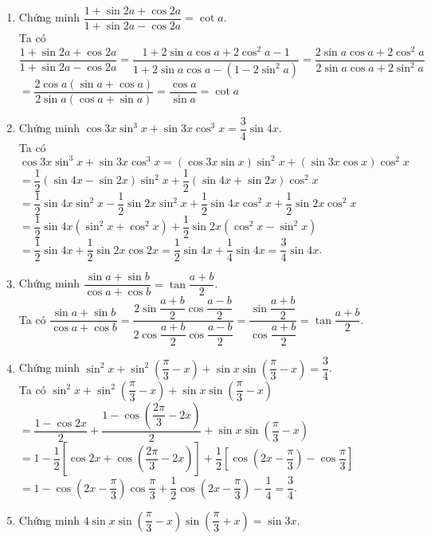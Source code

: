 \begin{bt}
{\begin{enumerate}
			\item Chứng minh $\dfrac{1+\sin 2a+\cos 2a}{1+\sin 2a-\cos 2a}=\cot a$. \\
			Ta có $\dfrac{1+\sin 2a+\cos 2a}{1+\sin 2a-\cos 2a}=\dfrac{1+2\sin a\cos a+2\cos^2a-1}{1+2\sin a\cos a-\left(1-2\sin^2a\right)}=\dfrac{2\sin a\cos a+2\cos^2a}{2\sin a\cos a+2\sin^2a}$ \\
			$=\dfrac{2\cos a\left(\sin a+\cos a\right)}{2\sin a\left(\cos a+\sin a\right)}=\dfrac{\cos a}{\sin a}=\cot a$
			\item Chứng minh $\cos 3x\sin^3x+\sin 3x\cos^3x=\dfrac{3}{4}\sin 4x$.\\
			Ta có $\cos 3x\sin^3x+\sin 3x\cos^3x=\left(\cos 3x\sin x\right)\sin^2x+\left(\sin 3x\cos x\right)\cos^2x$ \\
			$=\dfrac{1}{2}\left(\sin 4x-\sin 2x\right)\sin^2x+\dfrac{1}{2}\left(\sin 4x+\sin 2x\right)\cos^2x$ \\
			$=\dfrac{1}{2}\sin 4x\sin^2x-\dfrac{1}{2}\sin 2x\sin^2x+\dfrac{1}{2}\sin 4x\cos^2x+\dfrac{1}{2}\sin 2x\cos^2x$ \\
			$=\dfrac{1}{2}\sin 4x\left(\sin^2x+\cos^2x\right)+\dfrac{1}{2}\sin 2x\left(\cos^2x-\sin^2x\right)$ \\
			$=\dfrac{1}{2}\sin 4x+\dfrac{1}{2}\sin 2x\cos 2x=\dfrac{1}{2}\sin 4x+\dfrac{1}{4}\sin 4x=\dfrac{3}{4}\sin 4x$.
			\item Chứng minh $\dfrac{\sin a+\sin b}{\cos a+\cos b}=\tan \dfrac{a+b}{2}$.\\
			Ta có $\dfrac{\sin a+\sin b}{\cos a+\cos b}=\dfrac{2\sin \dfrac{a+b}{2} \cos \dfrac{a-b}{2}}{2\cos \dfrac{a+b}{2} \cos \dfrac{a-b}{2}}=\dfrac{\sin \dfrac{a+b}{2}}{\cos \dfrac{a+b}{2}}=\tan \dfrac{a+b}{2}$.
			\item Chứng minh $\sin^2x+\sin^2\left(\dfrac{\pi}{3}-x\right)+\sin x\sin \left(\dfrac{\pi}{3}-x\right)=\dfrac{3}{4}$.\\
			Ta có $\sin^2x+\sin^2\left(\dfrac{\pi}{3}-x\right)+\sin x\sin \left(\dfrac{\pi}{3}-x\right)$ \\
			$=\dfrac{1-\cos 2x}{2}+\dfrac{1-\cos \left(\dfrac{2\pi}{3}-2x\right)}{2}+\sin x\sin \left(\dfrac{\pi}{3}-x\right)$ \\
			$=1-\dfrac{1}{2}\left[\cos 2x+\cos \left(\dfrac{2\pi}{3}-2x\right)\right]+\dfrac{1}{2}\left[\cos \left(2x-\dfrac{\pi}{3}\right)-\cos \dfrac{\pi}{3}\right]$ \\
			$=1-\cos \left(2x-\dfrac{\pi}{3}\right)\cos \dfrac{\pi}{3}+\dfrac{1}{2}\cos \left(2x-\dfrac{\pi}{3}\right)-\dfrac{1}{4}=\dfrac{3}{4}$.
			\item Chứng minh $4\sin x\sin \left(\dfrac{\pi}{3}-x\right)\sin \left(\dfrac{\pi}{3}+x\right)=\sin 3x$.\\

\end{enumerate}}
\end{bt}
